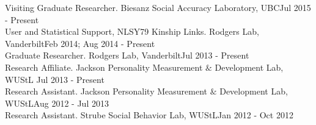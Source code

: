 Visiting Graduate Researcher. Biesanz Social Accuracy Laboratory, UBC\hfill Jul 2015 - Present\smallskip\\
User and Statistical Support, NLSY79 Kinship Links. Rodgers Lab, Vanderbilt\hfill Feb 2014; Aug 2014 - Present\smallskip\\%
Graduate Researcher. Rodgers Lab, Vanderbilt\hfill Jul 2013 - Present\smallskip\\
Research Affiliate. Jackson Personality Measurement $\&$ Development Lab, WUStL \hfill Jul 2013 - Present\smallskip\\
Research Assistant. Jackson Personality Measurement $\&$ Development Lab, WUStL\hfill Aug 2012 - Jul 2013\smallskip\\
Research Assistant. Strube Social Behavior Lab, WUStL\hfill Jan 2012 - Oct 2012\medskip\\
